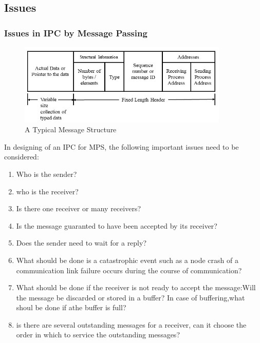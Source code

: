 \documentclass{beamer}
\begin{document}
\subsection{Issues}
\begin{frame}[allowframebreaks]
	\frametitle{Issues in IPC by Message Passing}
	\begin{figure}
		\centering
		\includegraphics[width=10cm]{messageStructure.jpg}
		\caption{A Typical Message Structure}
	\end{figure}
	\framebreak
	In designing of an IPC for MPS, the following important issues need to be considered:
	\begin{enumerate}
		\item Who is the sender?
		\item who is the receiver?
		\item Is there one receiver or many receivers?
		\item Is the message guaranted to have been accepted by its receiver?
		\item Does the sender need to wait for a reply?
		\item What should be done is a catastrophic event such as a node crash of a communication link failure occurs during the course of communication?
		\item What should be done if the receiver is not ready to accept the message:Will the message be discarded or stored in a buffer? In case of buffering,what shoul be done if athe buffer is full?
		\item is there are several outstanding messages for a receiver, can it choose the order in which to service the outstanding messages?
	\end{enumerate}	
\end{frame}
\end{document}
